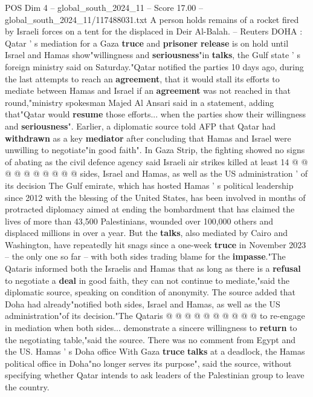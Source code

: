 \begin{textsample}{POS Dim 4 – global\_south\_2024\_11 – Score 17.00 – global\_south\_2024\_11/117488031.txt}  \label{ex:f4_pos_284}
A person holds remains of a rocket fired by Israeli forces on a tent for the displaced in Deir Al-Balah. -- Reuters DOHA : Qatar ' s mediation for a Gaza \textbf{truce} and \textbf{prisoner} \textbf{release} is on hold until Israel and Hamas show"willingness and \textbf{seriousness}"in \textbf{talks}, the Gulf state ' s foreign ministry said on Saturday."Qatar notified the parties 10 days ago, during the last attempts to reach an \textbf{agreement}, that it would stall its efforts to mediate between Hamas and Israel if an \textbf{agreement} was not reached in that round,"ministry spokesman Majed Al Ansari said in a statement, adding that"Qatar would \textbf{resume} those efforts... when the parties show their willingness and \textbf{seriousness}".
Earlier, a diplomatic source told AFP that Qatar had \textbf{withdrawn} as a key \textbf{mediator} after concluding that Hamas and Israel were unwilling to negotiate"in good faith".
In Gaza Strip, the fighting showed no signs of abating as the civil defence agency said Israeli air strikes killed at least 14 @ @ @ @ @ @ @ @ @ @ sides, Israel and Hamas, as well as the US administration ' of its decision The Gulf emirate, which has hosted Hamas ' s political leadership since 2012 with the blessing of the United States, has been involved in months of protracted diplomacy aimed at ending the bombardment that has claimed the lives of more than 43,500 Palestinians, wounded over 100,000 others and displaced millions in over a year.
But the \textbf{talks}, also mediated by Cairo and Washington, have repeatedly hit snags since a one-week \textbf{truce} in November 2023 -- the only one so far -- with both sides trading blame for the \textbf{impasse}."The Qataris informed both the Israelis and Hamas that as long as there is a \textbf{refusal} to negotiate a \textbf{deal} in good faith, they can not continue to mediate,"said the diplomatic source, speaking on condition of anonymity.
The source added that Doha had already"notified both sides, Israel and Hamas, as well as the US administration"of its decision."The Qataris @ @ @ @ @ @ @ @ @ @ to re-engage in mediation when both sides... demonstrate a sincere willingness to \textbf{return} to the negotiating table,"said the source.
There was no comment from Egypt and the US.
Hamas ' s Doha office With Gaza \textbf{truce} \textbf{talks} at a deadlock, the Hamas political office in Doha"no longer serves its purpose", said the source, without specifying whether Qatar intends to ask leaders of the Palestinian group to leave the country.

\end{textsample}
